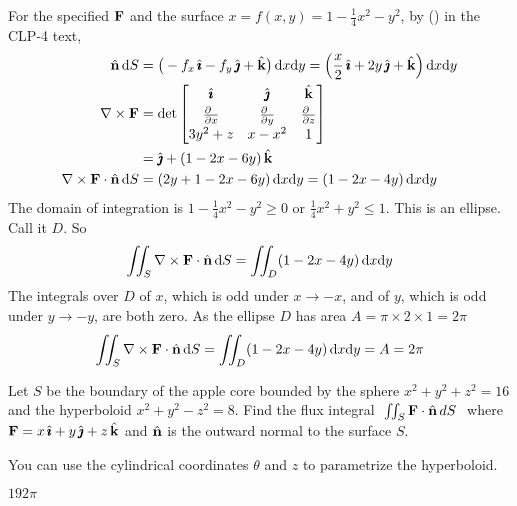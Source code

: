 \begin{solution} 
For the specified $\mathbf{F}$ and the surface 
$x=f(x,y)=1-\frac{1}{4}x^2-y^2$, by () in the CLP-4 text,
\begin{align*}
\hn\,\dee{S}&=\big(-f_x\,\hi-f_y\,\hj+\hk\big)\,\dee{x}\dee{y}
=\Big(\frac{x}{2}\,\hi+2y\,\hj+\hk\Big)\,\dee{x}\dee{y}\\
\nabla\times\vF&=\det\left[\begin{matrix}\hi&\hj&\hk\\[0.03in] 
     \frac{\partial\hfill}{\partial x}&
        \frac{\partial\hfill}{\partial y}&
        \frac{\partial\hfill}{\partial z}\\[0.03in]
3y^2+z&x-x^2&1\end{matrix}\right] \\
&=\hj+(1-2x-6y)\,\hk\\
\nabla\times\vF\cdot\hn\,\dee{S}&= (2y+1-2x-6y)\,\dee{x}\dee{y}= (1-2x-4y)\,\dee{x}\dee{y}
\end{align*}
The domain of integration is $1-\frac{1}{4}x^2-y^2\ge 0$ or
$\frac{1}{4}x^2+y^2\le 1$. This is an ellipse. Call it $D$. 
So
$$
\iint_S\nabla\times\mathbf{F}\cdot\hat{\mathbf{n}}\,\mathrm{d}S
=\iint_D (1-2x-4y)\,\mathrm{d}x\mathrm{d}y
$$
The integrals over $D$ of $x$, which is odd under $x\rightarrow-x$, 
and of $y$, which is odd under $y\rightarrow -y$, are both zero.
As the ellipse $D$ has area $A=\pi\times 2\times 1=2\pi$ 
$$
\iint_S\nabla\times\mathbf{F}\cdot\hat{\mathbf{n}}\,\mathrm{d}S
=\iint_D (1-2x-4y)\,\mathrm{d}x\mathrm{d}y
=A
=2\pi
$$
\end{solution}

\begin{question} 
Let $S$ be the boundary of the apple core bounded by the sphere 
$x^2+y^2+z^2=16$ and the hyperboloid $x^2+y^2-z^2=8$.
Find the flux integral
$\ \iint_S\mathbf{F}\cdot\hat{\mathbf{n}} \,dS\ $ where
$\mathbf{F}=x\,\hat{\pmb{\imath}}+y\,\hat{\pmb{\jmath}}+z\,\hat{\mathbf{k}}$
and $\hat{\mathbf{n}}$ is
the outward normal to the surface $S$.
\end{question}

\begin{hint}
You can use the cylindrical coordinates $\theta$ and $z$ to 
parametrize the hyperboloid. 
\end{hint}

\begin{answer} 
$192\pi$
\end{answer}

